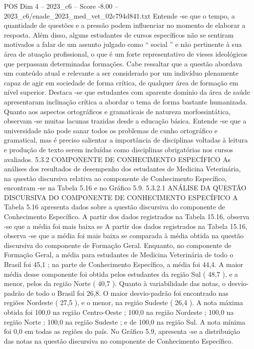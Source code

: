 \begin{textsample}{POS Dim 4 – 2023\_c6 – Score -8.00 – 2023\_c6/enade\_2023\_med\_vet\_02c794d841.txt}
Entende -se que o tempo, a quantidade de questões e a pressão podem influenciar no momento de elaborar a resposta.
Além disso, alguns estudantes de cursos específicos não se sentiram motivados a falar de um assunto julgado como “ social ” e não pertinente à sua área de atuação profissional, o que é um forte representativo de vieses ideológicos que perpassam determinadas formações.
Cabe ressaltar que a questão abordava um conteúdo atual e relevante a ser considerado por um indivíduo plenamente capaz de agir em sociedade de forma crítica, de qualquer área de formação em nível superior.
Destaca -se que estudantes com aparente domínio da área de saúde apresentaram inclinação crítica a abordar o tema de forma bastante humanizada.
Quanto aos aspectos ortográficos e gramaticais de natureza morfossintática, observam -se muitas lacunas trazidas desde a educação básica.
Entende -se que a universidade não pode sanar todos os problemas de cunho ortográfico e gramatical, mas é preciso salientar a importância de disciplinas voltadas à leitura e produção de texto serem incluídas como disciplinas obrigatórias nos cursos avaliados. 5.3.2 COMPONENTE DE CONHECIMENTO ESPECÍFICO As análises dos resultados de desempenho dos estudantes de Medicina Veterinária, na questão discursiva relativa ao componente de Conhecimento Específico, encontram -se na Tabela 5.16 e no Gráfico 5.9. 5.3.2.1 ANÁLISE DA QUESTÃO DISCURSIVA DO COMPONENTE DE CONHECIMENTO ESPECÍFICO A Tabela 5.16 apresenta dados sobre a questão discursiva do componente de Conhecimento Específico.
A partir dos dados registrados na Tabela 15.16, observa -se que a média foi mais baixa se A partir dos dados registrados na Tabela 15.16, observa -se que a média foi mais baixa se comparada à média obtida na questão discursiva do componente de Formação Geral.
Enquanto, no componente de Formação Geral, a média para estudantes de Medicina Veterinária de todo o Brasil foi 45,1 ; na parte de Conhecimento Específico, a média foi 44,4.
A maior média desse componente foi obtida pelos estudantes da região Sul ( 48,7 ), e a menor, pelos da região Norte ( 40,7 ).
Quanto à variabilidade das notas, o desvio-padrão de todo o Brasil foi 26,8.
O maior desvio-padrão foi encontrado nas regiões Nordeste ( 27,5 ), e o menor, na região Sudeste ( 26,4 ).
A nota máxima obtida foi 100,0 na região Centro-Oeste ; 100,0 na região Nordeste ; 100,0 na região Norte ; 100,0 na região Sudeste ; e de 100,0 na região Sul.
A nota mínima foi 0,0 em todas as regiões do país.
No Gráfico 5.9, apresenta -se a distribuição das notas na questão discursiva no componente de Conhecimento Específico.

\end{textsample}
